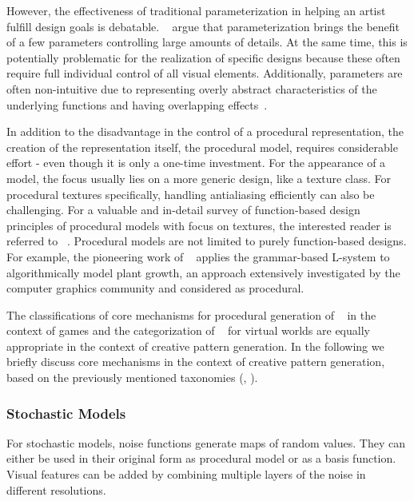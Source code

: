 However, the effectiveness of traditional parameterization in helping an artist fulfill design goals is debatable. \citeauthor*{ebert_2003_tmp}~\cite{ebert_2003_tmp} argue that parameterization brings the benefit of a few parameters controlling large amounts of details. At the same time, this is potentially problematic for the realization of specific designs because these often require full individual control of all visual elements. Additionally, parameters are often non-intuitive due to representing overly abstract characteristics of the underlying functions and having overlapping effects~\cite{bourque_2004_ptm,lagae_2010_pis,gilet_2010_ias,benes_2011_gpm,lasram_2012_ssf,lasram_2012_ptp}.

In addition to the disadvantage in the control of a procedural representation, the creation of the representation itself, the procedural model, requires considerable effort - even though it is only a one-time investment. For the appearance of a model, the focus usually lies on a more generic design, like a texture class. For procedural textures specifically, handling antialiasing efficiently can also be challenging. For a valuable and in-detail survey of function-based design principles of procedural models with focus on textures, the interested reader is referred to \citeauthor*{ebert_2003_tmp}~\cite{ebert_2003_tmp}. Procedural models are not limited to purely function-based designs. For example, the pioneering work of \citeauthor*{Prusinkiewicz_2012_TAB}~\cite{Prusinkiewicz_2012_TAB} applies the grammar-based L-system to algorithmically model plant growth, an approach extensively investigated by the computer graphics community and considered as procedural.

The classifications of core mechanisms for procedural generation of \citeauthor*{hendrikx_2013_pcg}~\cite{hendrikx_2013_pcg} in the context of games and the categorization of \citeauthor*{smelik_2014_aso}~\cite{smelik_2014_aso} for virtual worlds are equally appropriate in the context of creative pattern generation. In the following we briefly discuss core mechanisms in the context of creative pattern generation, based on the previously mentioned taxonomies (\cite{hendrikx_2013_pcg}, \cite{smelik_2014_aso}).

\subsubsection{Stochastic Models}

For stochastic models, noise functions generate maps of random values. They can either be used in their original form as procedural model or as a basis function. Visual features can be added by combining multiple layers of the noise in different resolutions. 

